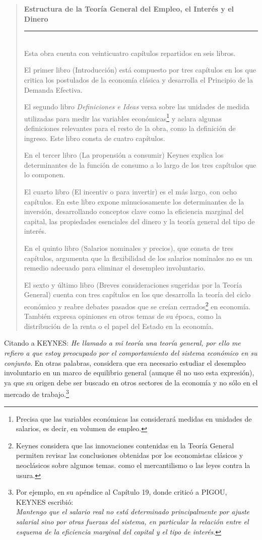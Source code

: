 \documentclass[10pt,a4paper]{article}
\newenvironment{specialblock}[1]{%
      \begin{quote} %
      \small %
      \noindent\textbf{#1}\\[-0.3em] %
      \rule{\linewidth}{0.4pt}\\[0.6em]}{
      \end{quote}}
\begin{document}
\begin{specialblock}{Estructura de la Teoría General del Empleo, el Interés y el Dinero}
    Esta obra cuenta con veinticuatro capítulos repartidos en seis libros. 
    
    El primer libro (Introducción) está compuesto por tres capítulos en los que critica los postulados de la economía clásica y desarrolla el Principio de la Demanda Efectiva. 
    
    El segundo libro \textit{Definiciones e Ideas} versa sobre las unidades de medida utilizadas para medir las variables económicas\footnote{%
        Precisa que las variables económicas las considerará medidas en unidades de salarios, es decir, en volumen de empleo.
    } y aclara algunas definiciones relevantes para el resto de la obra, como la definición de ingreso. Este libro consta de cuatro capítulos. 
    
    En el tercer libro (La propensión a consumir) Keynes explica los determinantes de la función de consumo a lo largo de los tres capítulos que lo componen. 
    
    El cuarto libro (El incentiv o para invertir) es el más largo, con ocho capítulos. En este libro expone minuciosamente los determinantes de la inversión, desarrollando conceptos clave como la eficiencia marginal del capital, las propiedades esenciales del dinero y la teoría general del tipo de interés. 
    
    En el quinto libro (Salarios nominales y precios), que consta de tres capítulos, argumenta que la flexibilidad de los salarios nominales no es un remedio adecuado para eliminar el desempleo involuntario. 
    
    El sexto y último libro (Breves consideraciones sugeridas por la Teoría General) cuenta con tres capítulos en los que desarrolla la teoría del ciclo económico y reabre debates pasados que se creían cerrados\footnote{%
        Keynes considera que las innovaciones contenidas en la Teoría General permiten revisar las conclusiones obtenidas por los economistas clásicos y neoclásicos sobre algunos temas. como el mercantilismo o las leyes contra la usura.
    } en economía. También expresa opiniones en otros temas de su época, como la distribución de la renta o el papel del Estado en la economía.
\end{specialblock}

Citando a KEYNES: \textit{He llamado a mi teoría una teoría general, por ello me refiero a que estoy preocupado por el comportamiento del sistema económico en su conjunto}. En otras palabras, considera que era necesario estudiar el desempleo involuntario en un marco de equilibrio general (aunque él no uso esta expresión), ya que su origen debe ser buscado en otros sectores de la economía y no sólo en el mercado de trabajo.\footnote{%
    Por ejemplo, en su apéndice al Capítulo 19, donde criticó a PIGOU, KEYNES escribió:\\
\textit{Mantengo que el salario real no está determinado principalmente por ajuste salarial sino por otras fuerzas del sistema, en particular la relación entre el esquema de la eficiencia marginal del capital y el tipo de interés}.
} 
\end{document}

